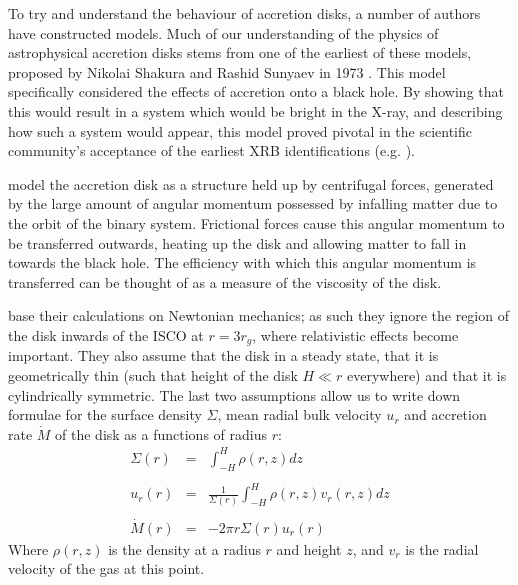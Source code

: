 \par{} To try and understand the behaviour of accretion disks, a number of authors have constructed models.  Much of our understanding of the physics of astrophysical accretion disks stems from one of the earliest of these models, proposed by Nikolai Shakura and Rashid Sunyaev in 1973 \citep{Shakura_Disk}.  This model specifically considered the effects of accretion onto a black hole.  By showing that this would result in a system which would be bright in the X-ray, and describing how such a system would appear, this model proved pivotal in the scientific community's acceptance of the earliest XRB identifications (e.g. \citealp{Bolton_CygX1}).
\par \citeauthor{Shakura_Disk} model the accretion disk as a structure held up by centrifugal forces, generated by the large amount of angular momentum possessed by infalling matter due to the orbit of the binary system.  Frictional forces cause this angular momentum to be transferred outwards, heating up the disk and allowing matter to fall in towards the black hole.  The efficiency with which this angular momentum is transferred can be thought of as a measure of the viscosity of the disk.
\par \citeauthor{Shakura_Disk} base their calculations on Newtonian mechanics; as such they ignore the region of the disk inwards of the ISCO at $r=3r_g$, where relativistic effects become important.  They also assume that the disk in a steady state, that it is geometrically thin (such that height of the disk $H\ll r$ everywhere) and that it is cylindrically symmetric.  The last two assumptions allow us to write down formulae for the surface density $\Sigma$, mean radial bulk velocity $u_r$ and accretion rate $\dot{M}$ of the disk as a functions of radius $r$:
\begin{eqnarray}
\Sigma(r)&=&\int_{-H}^H\rho(r,z) dz\label{eq:base1}\\\nonumber \\
u_r(r)&=&\frac{1}{\Sigma(r)}\int_{-H}^H\rho(r,z)v_r(r,z)dz\label{eq:base2}\\\nonumber \\
\dot{M}(r)&=&-2\pi r\Sigma(r) u_r(r)\label{eq:base3}
\end{eqnarray}
Where $\rho(r,z)$ is the density at a radius $r$ and height $z$, and $v_r$ is the radial velocity of the gas at this point.
